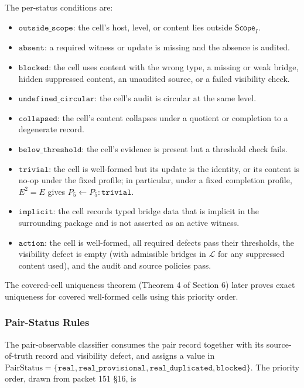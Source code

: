 \documentclass[11pt]{article}
\providecommand{\tightlist}{}
\theoremstyle{definition}
\begin{document}
The per-status conditions are:

\begin{itemize}
\tightlist
\item
  \(\texttt{outside\_scope}\): the cell's host, level, or content lies outside \(\mathsf{Scope}_I\).
\item
  \(\texttt{absent}\): a required witness or update is missing and the absence is audited.
\item
  \(\texttt{blocked}\): the cell uses content with the wrong type, a missing or weak bridge, hidden suppressed content, an unaudited source, or a failed visibility check.
\item
  \(\texttt{undefined\_circular}\): the cell's audit is circular at the same level.
\item
  \(\texttt{collapsed}\): the cell's content collapses under a quotient or completion to a degenerate record.
\item
  \(\texttt{below\_threshold}\): the cell's evidence is present but a threshold check fails.
\item
  \(\texttt{trivial}\): the cell is well-formed but its update is the identity, or its content is no-op under the fixed profile; in particular, under a fixed completion profile, \(E^2=E\) gives \(P_5\leftarrow P_5:\texttt{trivial}\).
\item
  \(\texttt{implicit}\): the cell records typed bridge data that is implicit in the surrounding package and is not asserted as an active witness.
\item
  \(\texttt{action}\): the cell is well-formed, all required defects pass their thresholds, the visibility defect is empty (with admissible bridges in \(\mathcal L\) for any suppressed content used), and the audit and source policies pass.
\end{itemize}

The covered-cell uniqueness theorem (Theorem 4 of Section 6) later proves exact uniqueness for covered well-formed cells using this priority order.

\subsubsection{Pair-Status Rules}

The pair-observable classifier consumes the pair record together with its source-of-truth record and visibility defect, and assigns a value in \(\mathrm{PairStatus}=\{\texttt{real},\texttt{real\_provisional},\texttt{real\_duplicated},\texttt{blocked}\}\). The priority order, drawn from packet 151 §16, is
\end{document}
